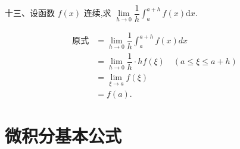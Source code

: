 \documentclass[lang=cn,newtx,10pt,scheme=chinese]{elegantbook}
\begin{document}
~\\
十三、设函数 $f(x)$ 连续,求 $\lim\limits _{h \rightarrow 0} \dfrac{1}{h} \displaystyle\int_a^{a+h} f(x) \mathrm{d} x$.\\
\begin{solution}	 
	 \begin{align*}
	 	\text{原式}&=\lim\limits _{h \rightarrow 0} \dfrac{1}{h} \displaystyle\int_a^{a+h} f(x) d x \\
	 	&=\lim\limits_{h \rightarrow 0} \dfrac{1}{h} \cdot hf(\xi)\quad(a \leqslant \xi \leqslant a+h)\\
	 	&=\lim\limits _{\xi\rightarrow a} f(\xi)\\
	 	&=  f(a).
	 \end{align*}
\end{solution}







\chapter{微积分基本公式}
\end{document}
